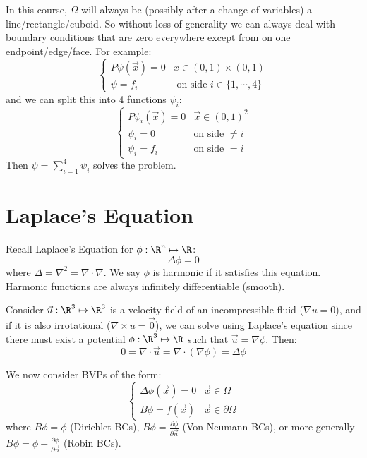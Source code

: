 \documentclass[../Main.tex]{subfiles}
\begin{document}
In this course, $\Omega$ will always be (possibly after a change of variables) a line/rectangle/cuboid. So without loss of generality we can always deal with boundary conditions that are zero everywhere except from on one endpoint/edge/face. For example:
\begin{equation}
    \begin{cases}
        P\psi(\vec{x}) = 0 & x \in (0, 1) \times (0, 1) \\
        \psi = f_i & \text{ on side } i \in \{1, \cdots, 4\}
    \end{cases}
    \label{eqneqnBVPSquare}
\end{equation}
and we can split this into 4 functions $\psi_i$:
\begin{equation*}
    \begin{cases}
        P\psi_i(\vec{x}) = 0 & \vec{x} \in (0, 1)^2 \\
        \psi_i = 0 & \text{on side } \neq i \\
        \psi_i = f_i & \text{on side } = i
    \end{cases}
\end{equation*}
Then $\psi = \sum_{i=1}^4 \psi_i$ solves the problem.
\section{Laplace's Equation}
Recall Laplace's Equation for $\phi : \R^n \mapsto \R$:
\begin{equation}
    \Delta \phi = 0
    \label{eqnLaplace}
\end{equation}
where $\Delta = \nabla^2 = \nabla \cdot \nabla$. We say $\phi$ is \underline{harmonic} if it satisfies this equation. Harmonic functions are always infinitely differentiable (smooth).
\begin{example}
    Consider $\vec{u} : \R^3 \mapsto \R^3$ is a velocity field of an incompressible fluid ($\nabla u = 0$), and if it is also irrotational ($\nabla \times u = \vec{0}$), we can solve using Laplace's equation since there must exist a potential $\phi : \R^3 \mapsto \R$ such that $\vec{u} = \nabla \phi$. Then:
    \begin{equation*}
        0 = \nabla \cdot \vec{u} = \nabla \cdot (\nabla \phi) = \Delta \phi
    \end{equation*}
\end{example}
We now consider BVPs of the form:
\begin{equation*}
    \begin{cases}
        \Delta \phi(\vec{x}) = 0 & \vec{x} \in \Omega \\
        B\phi = f(\vec{x}) & \vec{x} \in \partial \Omega
    \end{cases}
\end{equation*}
where $B\phi = \phi$ (Dirichlet BCs), $B\phi = \frac{\partial \phi}{\partial \vec{n}}$ (Von Neumann BCs), or more generally $B\phi = \phi + \frac{\partial \phi}{\partial \vec{n}}$ (Robin BCs).
\end{document}
